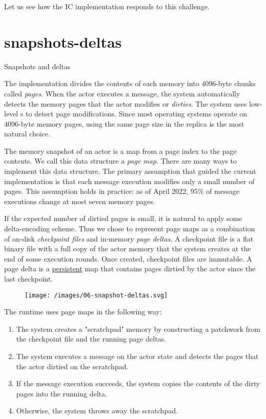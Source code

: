 \documentclass{article}
\begin{document}
Let us see how the IC implementation responds to this challenge.

\section{snapshots-deltas}{Snapshots and deltas}

The implementation divides the contents of each memory into 4096-byte chunks called \emph{pages}.
When the actor executes a message, the system automatically detects the memory pages that the actor modifies or \emph{dirties}.
The system uses low-level s to detect page modifications.
Since most operating systems operate on 4096-byte memory pages, using the same page size in the replica is the most natural choice.

The memory snapshot of an actor is a map from a page index to the page contents.
We call this data structure a \emph{page map}.
There are many ways to implement this data structure.
The primary assumption that guided the current implementation is that each message execution modifies only a small number of pages.
This assumption holds in practice: as of April 2022, 95\% of message executions change at most seven memory pages.

If the expected number of dirtied pages is small, it is natural to apply some delta-encoding scheme.
Thus we chose to represent page maps as a combination of on-disk \emph{checkpoint files} and in-memory \emph{page deltas}.
A checkpoint file is a flat binary file with a full copy of the actor memory that the system creates at the end of some execution rounds.
Once created, checkpoint files are immutable.
A page delta is a \href{https://en.wikipedia.org/wiki/Persistent_data_structure}{persistent} map that contains pages dirtied by the actor since the last checkpoint.

\begin{figure}[grayscale-diagram]
\texttt{[image: /images/06-snapshot-deltas.svg]}
\end{figure}

The runtime uses page maps in the following way:
\begin{enumerate}
  \item The system creates a "scratchpad" memory by constructing a patchwork from the checkpoint file and the running page deltas.
  \item The system executes a message on the actor state and detects the pages that the actor dirtied on the scratchpad.
  \item If the message execution succeeds, the system copies the contents of the dirty pages into the running delta.
  \item Otherwise, the system throws away the scratchpad.
\end{enumerate}
\end{document}

